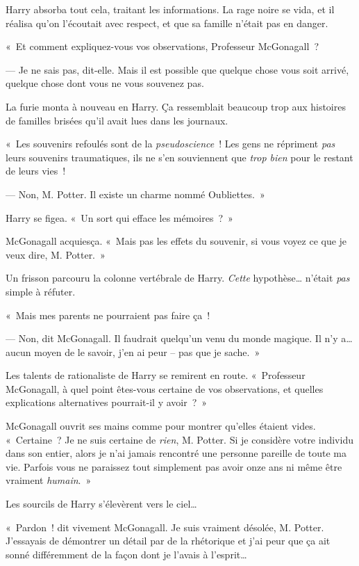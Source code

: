 Harry absorba tout cela, traitant les informations. La rage noire se vida, et il réalisa qu'on l'écoutait avec respect, et que sa famille n'était pas en danger.

«~Et comment expliquez-vous vos observations, Professeur McGonagall~?

--- Je ne sais pas, dit-elle. Mais il est possible que quelque chose vous soit arrivé, quelque chose dont vous ne vous souvenez pas.

La furie monta à nouveau en Harry. Ça ressemblait beaucoup trop aux histoires de familles brisées qu'il avait lues dans les journaux.

«~Les souvenirs refoulés sont de la \emph{pseudoscience}~! Les gens ne répriment \emph{pas} leurs souvenirs traumatiques, ils ne s'en souviennent que \emph{trop bien} pour le restant de leurs vies~!

--- Non, M. Potter. Il existe un charme nommé Oubliettes.~»

Harry se figea. «~Un sort qui efface les mémoires~?~»

McGonagall acquiesça. «~Mais pas les effets du souvenir, si vous voyez ce que je veux dire, M. Potter.~»

Un frisson parcouru la colonne vertébrale de Harry. \emph{Cette} hypothèse… n'était \emph{pas} simple à réfuter.

«~Mais mes parents ne pourraient pas faire ça~!

--- Non, dit McGonagall. Il faudrait quelqu'un venu du monde magique. Il n'y a… aucun moyen de le savoir, j'en ai peur -- pas que je sache.~»

Les talents de rationaliste de Harry se remirent en route. «~Professeur McGonagall, à quel point êtes-vous certaine de vos observations, et quelles explications alternatives pourrait-il y avoir~?~»

McGonagall ouvrit ses mains comme pour montrer qu'elles étaient vides. «~Certaine~? Je ne suis certaine de \emph{rien}, M. Potter. Si je considère votre individu dans son entier, alors je n'ai jamais rencontré une personne pareille de toute ma vie. Parfois vous ne paraissez tout simplement pas avoir onze ans ni même être vraiment \emph{humain}.~»

Les sourcils de Harry s'élevèrent vers le ciel…

«~Pardon~! dit vivement McGonagall. Je suis vraiment désolée, M. Potter. J'essayais de démontrer un détail par de la rhétorique et j'ai peur que ça ait sonné différemment de la façon dont je l'avais à l'esprit…

